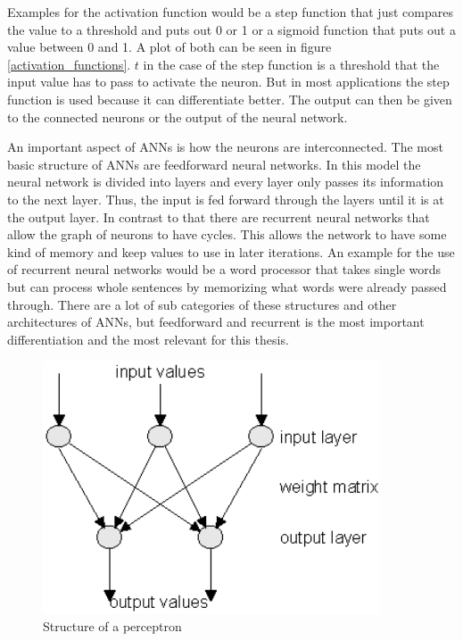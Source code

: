 Examples for the activation function would be a step function that just compares the value to a threshold and puts out 0 or 1 or a sigmoid function that puts out a value between 0 and 1. A plot of both can be seen in figure \ref{activation_functions}. $t$ in the case of the step function is a threshold that the input value has to pass to activate the neuron. But in most applications the step function is used because it can differentiate better. The output can then be given to the connected neurons or the output of the neural network.

An important aspect of ANNs is how the neurons are interconnected. The most basic structure of ANNs are feedforward neural networks. In this model the neural network is divided into layers and every layer only passes its information to the next layer. Thus, the input is fed forward through the layers until it is at the output layer. In contrast to that there are recurrent neural networks that allow the graph of neurons to have cycles. This allows the network to have some kind of memory and keep values to use in later iterations. An example for the use of recurrent neural networks would be a word processor that takes single words but can process whole sentences by memorizing what words were already passed through. There are a lot of sub categories of these structures and other architectures of ANNs, but feedforward and recurrent is the most important differentiation and the most relevant for this thesis.

\begin{figure}[ht]
	\centering
  \includegraphics[width=10cm]{figures/perceptron}
	\caption[Structure of a perceptron]{Structure of a perceptron \protect\footnotemark}
	\label{perceptron}
\end{figure}

